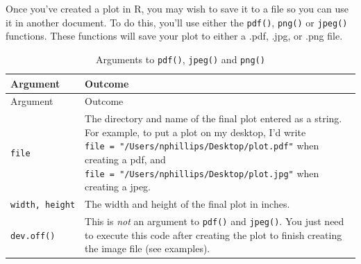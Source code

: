 \documentclass[]{book}
\theoremstyle{definition}
\theoremstyle{definition}
\theoremstyle{remark}
\begin{document}
Once you've created a plot in R, you may wish to save it to a file so
you can use it in another document. To do this, you'll use either the
\texttt{pdf()}, \texttt{png()} or \texttt{jpeg()} functions. These
functions will save your plot to either a .pdf, .jpg, or .png file.

\begin{longtable}[]{@{}ll@{}}
\caption{\label{tab:pdfarguments} Arguments to \texttt{pdf()},
\texttt{jpeg()} and \texttt{png()}}\tabularnewline
\toprule
\begin{minipage}[b]{0.14\columnwidth}\raggedright\strut
Argument\strut
\end{minipage} & \begin{minipage}[b]{0.71\columnwidth}\raggedright\strut
Outcome\strut
\end{minipage}\tabularnewline
\midrule
\endfirsthead
\toprule
\begin{minipage}[b]{0.14\columnwidth}\raggedright\strut
Argument\strut
\end{minipage} & \begin{minipage}[b]{0.71\columnwidth}\raggedright\strut
Outcome\strut
\end{minipage}\tabularnewline
\midrule
\endhead
\begin{minipage}[t]{0.14\columnwidth}\raggedright\strut
\texttt{file}\strut
\end{minipage} & \begin{minipage}[t]{0.71\columnwidth}\raggedright\strut
The directory and name of the final plot entered as a string. For
example, to put a plot on my desktop, I'd write
\texttt{file\ =\ "/Users/nphillips/Desktop/plot.pdf"} when creating a
pdf, and \texttt{file\ =\ "/Users/nphillips/Desktop/plot.jpg"} when
creating a jpeg.\strut
\end{minipage}\tabularnewline
\begin{minipage}[t]{0.14\columnwidth}\raggedright\strut
\texttt{width,\ height}\strut
\end{minipage} & \begin{minipage}[t]{0.71\columnwidth}\raggedright\strut
The width and height of the final plot in inches.\strut
\end{minipage}\tabularnewline
\begin{minipage}[t]{0.14\columnwidth}\raggedright\strut
\texttt{dev.off()}\strut
\end{minipage} & \begin{minipage}[t]{0.71\columnwidth}\raggedright\strut
This is \emph{not} an argument to \texttt{pdf()} and \texttt{jpeg()}.
You just need to execute this code after creating the plot to finish
creating the image file (see examples).\strut
\end{minipage}\tabularnewline
\bottomrule
\end{longtable}
\end{document}
